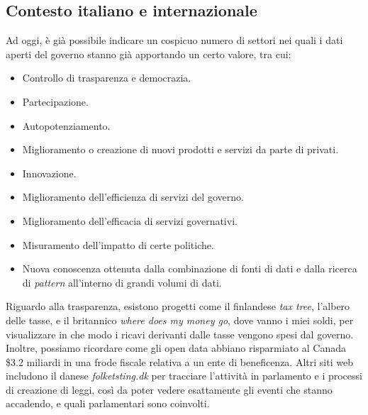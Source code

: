 

\subsection{Contesto italiano e internazionale}
Ad oggi, è già possibile indicare un cospicuo numero di settori nei quali i dati aperti del governo stanno già apportando un certo valore, tra cui:

\begin{itemize}
    \item Controllo di trasparenza e democrazia.
    \item Partecipazione.
    \item Autopotenziamento.
    \item Miglioramento o creazione di nuovi prodotti e servizi da parte di privati.
    \item Innovazione.
    \item Miglioramento dell'efficienza di servizi del governo.
    \item Miglioramento dell'efficacia di servizi governativi.
    \item Misuramento dell'impatto di certe politiche.
    \item Nuova conoscenza ottenuta dalla combinazione di fonti di dati e dalla ricerca di \textit{pattern} all'interno di grandi volumi di dati.
\end{itemize}

Riguardo alla trasparenza, esistono progetti come il finlandese \textit{tax tree}, l'albero delle tasse, e il britannico \textit{where does my money go}, dove vanno i miei soldi, per visualizzare in che modo i ricavi derivanti dalle tasse vengono spesi dal governo. Inoltre, possiamo ricordare come gli open data abbiano risparmiato al Canada \$3.2 miliardi in una frode fiscale relativa a un ente di beneficenza. Altri siti web includono il danese \textit{folketsting.dk} per tracciare l'attività in parlamento e i processi di creazione di leggi, così da poter vedere esattamente gli eventi che stanno accadendo, e quali parlamentari sono coinvolti.

